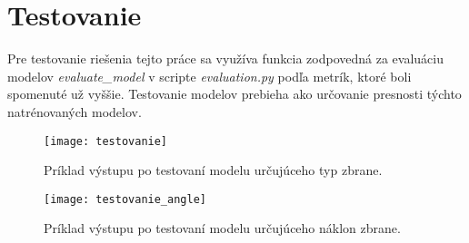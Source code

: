 
\section{Testovanie}
\label{sec:testovanie}
Pre testovanie riešenia tejto práce sa využíva funkcia zodpovedná za evaluáciu modelov \textit{evaluate\_model} v scripte \textit{evaluation.py}
    podľa metrík, ktoré boli spomenuté už vyššie.
Testovanie modelov prebieha ako určovanie presnosti týchto natrénovaných modelov.

\begin{figure}[H]
    \centering
    \texttt{[image: testovanie]}
    \caption{Príklad výstupu po testovaní modelu určujúceho typ zbrane.}
    \label{pic:testovanie}
\end{figure}

\begin{figure}[H]
    \centering
    \texttt{[image: testovanie\_angle]}
    \caption{Príklad výstupu po testovaní modelu určujúceho náklon zbrane.}
    \label{pic:testovanie}
\end{figure}
